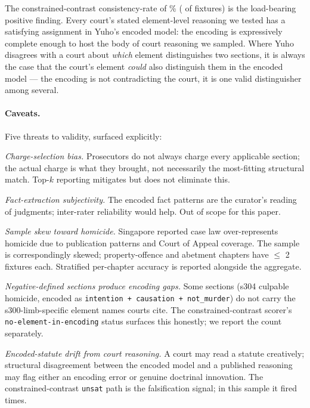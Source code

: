 The constrained-contrast consistency-rate of
\statCaseLawConsistency{}\% (\statCaseLawConsistencyN{} of
\statCaseLawConsistencyN{} fixtures) is the load-bearing positive
finding. Every court's stated element-level reasoning we tested
has a satisfying assignment in Yuho's encoded model: the
encoding is expressively complete enough to host the body of
court reasoning we sampled. Where Yuho disagrees with a court
about \emph{which} element distinguishes two sections, it is
always the case that the court's element \emph{could} also
distinguish them in the encoded model --- the encoding is not
contradicting the court, it is one valid distinguisher among
several.

\paragraph{Caveats.} Five threats to validity, surfaced
explicitly:

\textit{Charge-selection bias.} Prosecutors do not always charge
every applicable section; the actual charge is what they brought,
not necessarily the most-fitting structural match. Top-$k$
reporting mitigates but does not eliminate this.

\textit{Fact-extraction subjectivity.} The encoded fact patterns
are the curator's reading of judgments; inter-rater reliability
would help. Out of scope for this paper.

\textit{Sample skew toward homicide.} Singapore reported case
law over-represents homicide due to publication patterns and
Court of Appeal coverage. The sample is correspondingly skewed;
property-offence and abetment chapters have $\le$ 2 fixtures each.
Stratified per-chapter accuracy is reported alongside the
aggregate.

\textit{Negative-defined sections produce encoding gaps.} Some
sections (\textsf{s304} culpable homicide, encoded as
\texttt{intention + causation + not\_murder}) do not carry the
\textsf{s300}-limb-specific element names courts cite. The
constrained-contrast scorer's \texttt{no-element-in-encoding}
status surfaces this honestly; we report the count separately.

\textit{Encoded-statute drift from court reasoning.} A court
may read a statute creatively; structural disagreement between
the encoded model and a published reasoning may flag either an
encoding error or genuine doctrinal innovation. The
constrained-contrast \texttt{unsat} path is the falsification
signal; in this sample it fired \statCaseLawUnsatN{} times.

